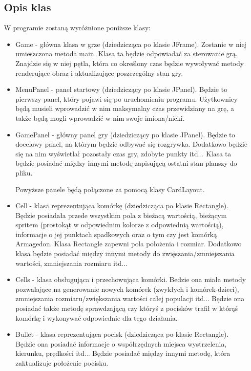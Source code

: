 \documentclass{article}
\begin{document}
\subsection{Opis klas}
W programie zostaną wyróżnione poniższe klasy:
\begin{itemize}
\item Game - główna klasa w grze (dziedzicząca po klasie JFrame). Zostanie w niej umieszczona metoda main. Klasa ta będzie odpowiadać za sterowanie grą. Znajdzie się w niej pętla, która co określony czas będzie wywoływać metody renderujące obraz i aktualizujące poszczególny stan gry.

\item MenuPanel - panel startowy (dziedziczący po klasie JPanel). Będzie to pierwszy panel, który pojawi się po uruchomieniu programu. Użytkownicy będą musieli wprowadzić w nim maksymalny czas przewidziany na grę, a także będą mogli wprowadzić w nim swoje imiona/nicki.

\item GamePanel - główny panel gry (dziedziczący po klasie JPanel). Będzie to docelowy panel, na którym będzie odbywać się rozgrywka. Dodatkowo będzie się na nim wyświetlał pozostały czas gry, zdobyte punkty itd... Klasa ta będzie posiadać między innymi metodę zapisującą ostatni stan planszy do pliku.

Powyższe panele będą połączone za pomocą klasy CardLayout.

\item Cell - klasa reprezentująca komórkę (dziedzicząca po klasie Rectangle). Będzie posiadała przede wszystkim pola z bieżacą wartością, bieżącym spritem (prostokąt w odpowiednim kolorze z odpowiednią wartością), informacje o jej punktach spadkowych oraz o tym czy jest komórką Armagedon. Klasa Rectangle zapewni pola położenia i rozmiar. Dodatkowo klasa będzie posiadać między innymi metody do zwięszania/zmniejszania wartości, zmniejszania rozmiaru itd...

\item Cells - klasa obsługująca i przechowująca komórki. Bedzie ona miała metody pozwalające na generowanie nowych komórek (zwykłych i komórek-dzieci), zmniejszania rozmiaru/zwiększania wartości całej populacji itd... Będzie ona posiadać także metodę sprawdzającą czy któryś z pocisków trafił w którąś komórkę i wykonywać odpowiednie dla tego działania.

\item Bullet - klasa reprezentująca pocisk (dziedzicząca po klasie Rectangle). Będzie ona posiadać informacje o współrzędnych miejsca wystrzelenia, kierunku, prędkości itd...
Będzie posiadać między innymi metodę, która zaktualizuje położenie pocisku.


\end{itemize}
\end{document}
